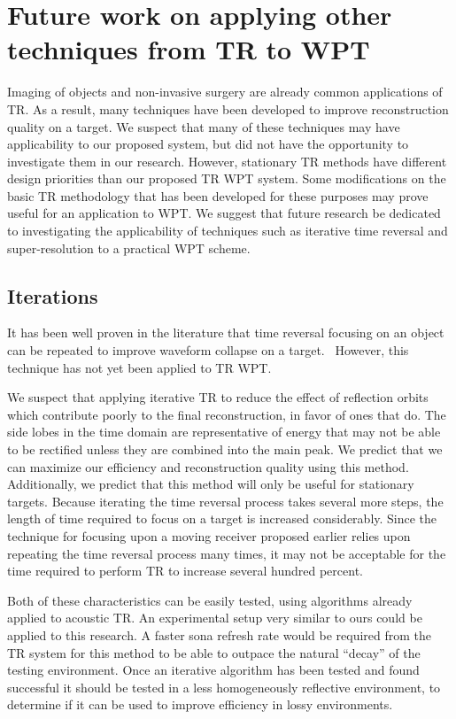 \section{Future work on applying other techniques from TR to WPT}
\label{sec:future-tr}
Imaging of objects and non-invasive surgery are already common applications of TR.
As a result, many techniques have been developed to improve reconstruction quality on a target.
We suspect that many of these techniques may have applicability to our proposed system, but did not
have the opportunity to investigate them in our research.
However, stationary TR methods have different design priorities than our proposed TR WPT system.
Some modifications on the basic TR methodology that has been developed for these purposes may prove useful for an application to WPT. We suggest that future research be dedicated to investigating the applicability of techniques such as iterative time reversal and super-resolution to a practical WPT scheme.

\subsection{Iterations}

It has been well proven in the literature that time reversal focusing on an object can be repeated to improve waveform collapse on a target.~\cite{prada_iterative_1991} However, this technique has not yet been applied to TR WPT.

We suspect that applying iterative TR to reduce the effect of reflection orbits which contribute poorly to the final reconstruction, in favor of ones that do. The side lobes in the time domain are representative of energy that may not be able to be rectified unless they are combined into the main peak. We predict that we can maximize our efficiency and reconstruction quality using this method. Additionally, we predict that this method will only be useful for stationary targets. Because iterating the time reversal process takes several more steps, the length of time required to focus on a target is increased considerably. Since the technique for focusing upon a moving receiver proposed earlier relies upon repeating the time reversal process many times, it may not be acceptable for the time required to perform TR to increase several hundred percent.

Both of these characteristics can be easily tested, using algorithms already applied to acoustic TR. An experimental setup very similar to ours could be applied to this research. A faster sona refresh rate would be required from the TR system for this method to be able to outpace the natural ``decay'' of the testing environment. Once an iterative algorithm has been tested and found successful it should be tested in a less homogeneously reflective environment, to determine if it can be used to improve efficiency in lossy environments.

